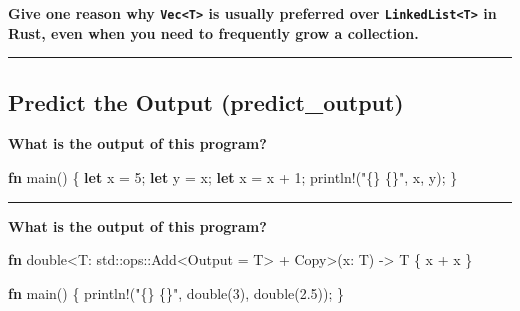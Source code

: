 \documentclass[
  11pt,
]{article}
\newenvironment{Shaded}{}{}
\newcommand{\BuiltInTok}[1]{\textcolor[rgb]{0.00,0.50,0.00}{#1}}
\newcommand{\DecValTok}[1]{\textcolor[rgb]{0.25,0.63,0.44}{#1}}
\newcommand{\KeywordTok}[1]{\textcolor[rgb]{0.00,0.44,0.13}{\textbf{#1}}}
\newcommand{\NormalTok}[1]{#1}
\newcommand{\OperatorTok}[1]{\textcolor[rgb]{0.40,0.40,0.40}{#1}}
\newcommand{\PreprocessorTok}[1]{\textcolor[rgb]{0.74,0.48,0.00}{#1}}
\newcommand{\StringTok}[1]{\textcolor[rgb]{0.25,0.44,0.63}{#1}}
\begin{document}
\textbf{Give one reason why \texttt{Vec\textless{}T\textgreater{}} is
usually preferred over \texttt{LinkedList\textless{}T\textgreater{}} in
Rust, even when you need to frequently grow a collection.}

\begin{center}\rule{0.5\linewidth}{0.5pt}\end{center}

\subsection{Predict the Output
(predict\_output)}\label{predict-the-output-predict_output}

\textbf{What is the output of this program?}

\begin{Shaded}
\begin{Highlighting}[]
\KeywordTok{fn}\NormalTok{ main() }\OperatorTok{\{}
    \KeywordTok{let}\NormalTok{ x }\OperatorTok{=} \DecValTok{5}\OperatorTok{;}
    \KeywordTok{let}\NormalTok{ y }\OperatorTok{=}\NormalTok{ x}\OperatorTok{;}
    \KeywordTok{let}\NormalTok{ x }\OperatorTok{=}\NormalTok{ x }\OperatorTok{+} \DecValTok{1}\OperatorTok{;}
    \PreprocessorTok{println!}\NormalTok{(}\StringTok{"\{\} \{\}"}\OperatorTok{,}\NormalTok{ x}\OperatorTok{,}\NormalTok{ y)}\OperatorTok{;}
\OperatorTok{\}}
\end{Highlighting}
\end{Shaded}

\begin{center}\rule{0.5\linewidth}{0.5pt}\end{center}

\textbf{What is the output of this program?}

\begin{Shaded}
\begin{Highlighting}[]
\KeywordTok{fn}\NormalTok{ double}\OperatorTok{\textless{}}\NormalTok{T}\OperatorTok{:} \PreprocessorTok{std::ops::}\BuiltInTok{Add}\OperatorTok{\textless{}}\NormalTok{Output }\OperatorTok{=}\NormalTok{ T}\OperatorTok{\textgreater{}} \OperatorTok{+} \BuiltInTok{Copy}\OperatorTok{\textgreater{}}\NormalTok{(x}\OperatorTok{:}\NormalTok{ T) }\OperatorTok{{-}\textgreater{}}\NormalTok{ T }\OperatorTok{\{}
\NormalTok{    x }\OperatorTok{+}\NormalTok{ x}
\OperatorTok{\}}

\KeywordTok{fn}\NormalTok{ main() }\OperatorTok{\{}
    \PreprocessorTok{println!}\NormalTok{(}\StringTok{"\{\} \{\}"}\OperatorTok{,}\NormalTok{ double(}\DecValTok{3}\NormalTok{)}\OperatorTok{,}\NormalTok{ double(}\DecValTok{2.5}\NormalTok{))}\OperatorTok{;}
\OperatorTok{\}}
\end{Highlighting}
\end{Shaded}
\end{document}
